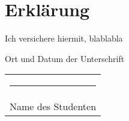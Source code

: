 
\thispagestyle{empty}

\section*{Erklärung}
\vspace*{2em}

Ich versichere hiermit, blablabla

\vspace{3em}

{\color{red}Ort und Datum der Unterschrift}
\vspace{4em}

\begin{tabular}{p{}}
    \rule{7cm}{0.4pt}\\
    Name des Studenten
\end{tabular}


